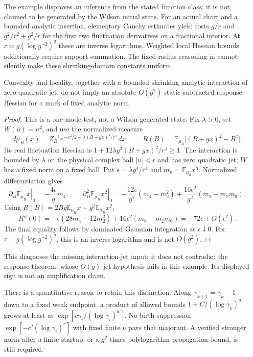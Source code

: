 The example disproves an inference from the stated function class;
it is not claimed to be generated by the Wilson initial state.
For an actual chart and a bounded analytic insertion, elementary
Cauchy estimates yield costs $g/r$ and $g^2/r^2+g^2/r$ for the first
two fluctuation derivatives on a fractional interior. At
$r\asymp g(\log g^{-2})^q$ these are inverse logarithms. Weighted
local Hessian bounds additionally require support summation. The
fixed-radius reasoning in \cite[(1.19)--(1.22), Lemma~1]{B116}
cannot silently make these shrinking-domain constants uniform.

\begin{proposition}
Convexity and locality, together with a bounded shrinking analytic
interaction of zero quadratic jet, do not imply an absolute $O(g^2)$
static-subtracted response Hessian for a mark of fixed analytic norm.
\end{proposition}

\begin{proof}
This is a one-mode test, not a Wilson-generated state. Fix $\lambda>0$,
set $W(u)=u^2$, and use the normalized measure
\[
 d\mu_B(x)=Z_B^{-1}
   e^{-x^2/2-\lambda(B+gx)^4/r^4}\,dx,
 \qquad R(B)=\mathbb E_{\mu_B}\bigl[(B+gx)^2-B^2\bigr].
\]
Its real fluctuation Hessian is
$1+12\lambda g^2(B+gx)^2/r^4\geq1$. The interaction is bounded
by $\lambda$ on the physical complex ball $|u|<r$ and has zero
quadratic jet; $W$ has a fixed norm on a fixed ball. Put
$\epsilon=\lambda g^4/r^4$ and $m_n=\mathbb E_{\mu_0}x^n$.
Normalized differentiation gives
\[
 \left.\partial_B\mathbb E_{\mu_B}x\right|_0
       =-\frac{4\epsilon}{g}m_4,
 \qquad
 \left.\partial_B^2\mathbb E_{\mu_B}x^2\right|_0
       =-\frac{12\epsilon}{g^2}(m_4-m_2^2)
        +\frac{16\epsilon^2}{g^2}(m_8-m_2m_6).
\]
Using $R(B)=2Bg\mathbb E_{\mu_B}x+g^2\mathbb E_{\mu_B}x^2$,
\[
 R''(0)=-\epsilon(28m_4-12m_2^2)
          +16\epsilon^2(m_8-m_2m_6)
        =-72\epsilon+O(\epsilon^2).
\]
The final equality follows by dominated Gaussian integration as
$\epsilon\downarrow0$. For $r=g(\log g^{-2})^q$, this is an inverse
logarithm and is not $O(g^2)$.
\end{proof}

This diagnoses the missing interaction-jet input; it does not
contradict the response theorem, whose $O(g)$ jet hypothesis fails
in this example. Its displayed sign is not an amplification claim.

There is a quantitative reason to retain this distinction. Along
$\gamma_{k+1}=\gamma_k-1$ down to a fixed weak endpoint, a product of
allowed bounds $1+C/(\log\gamma_k)^a$ grows at least as
$\exp[c\gamma_i/(\log\gamma_i)^a]$. No birth suppression
$\exp[-c'(\log\gamma_i)^\nu]$ with fixed finite $\nu$ pays that
majorant. A verified stronger norm after a finite startup, or a
$g^2$ times polylogarithm propagation bound, is still required.

